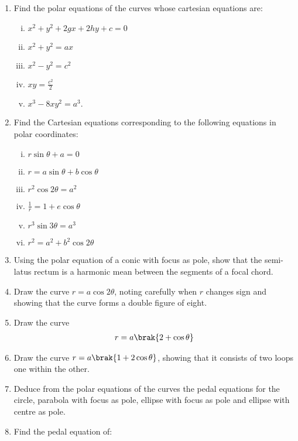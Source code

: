 \begin{enumerate}[1.]
\item Find the polar equations of the curves whose cartesian equations are:
\begin{enumerate}[(i)]
\item 
$
x^2+y^2+2gx+2hy+c = 0
$
\item 
$
x^2+y^2 = ax
$
\item 
$
x^2-y^2=c^2
$
\item 
$
xy = \frac{c^2}{2}
$
\item 
$
x^3-8xy^2 = a^3.
$

\end{enumerate}
\item Find the Cartesian equations corresponding to the following
equations in polar coordinates:
\begin{enumerate}[(i)]
\item 
$
r\sin\theta + a = 0
$
\item 
$
r = a\sin\theta + b\cos\theta
$
\item 
$
r^2\cos2\theta = a^2
$
\item 
$
\frac{1}{r} = 1 + e\cos\theta
$
\item 
$
r^3\sin3\theta = a^3
$
\item 
$
r^2=a^2+b^2\cos2\theta
$
\end{enumerate}
\item Using the polar equation of a conic with focus as pole, show that
the semi-latus rectum is a harmonic mean between the segments of
a focal chord.
\item Draw the curve $r=a\cos2\theta$, noting carefully when $r$
changes sign and showing that the curve forms a double figure of eight.
\item Draw the curve
\begin{align*}
r = a\brak{2+\cos\theta}
\end{align*}
\item Draw the curve $r = a\brak{1+2\cos\theta}$, showing that it consists of two loops one within
the other.
\item Deduce from the polar equations of the curves the pedal equations for
the circle, parabola with focus as pole, ellipse with focus as pole and
ellipse with centre as pole.
\item Find the pedal equation of:
\end{enumerate}
